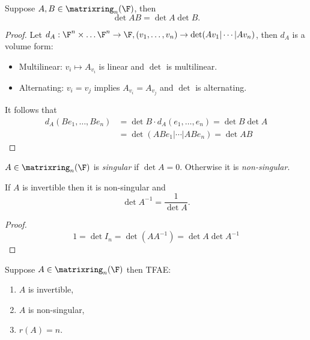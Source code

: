 \documentclass[a4paper]{article}
\newcommand*{\M}{\matrixring}
\theoremstyle{definition}
\begin{document}
\begin{proposition}
  Suppose \(A, B \in \M_n(\F)\), then
  \[
    \det AB =\det A \det B.
  \]
\end{proposition}

\begin{proof}
  Let \(d_A: \F^n \times \dots \F^n \to \F, (v_1, \dots, v_n) \to \det(Av_1|\cdots|Av_n)\), then \(d_A\) is a volume form:
  \begin{itemize}
  \item Multilinear: \(v_i \mapsto A_{v_i}\) is linear and \(\det\) is multilinear.
  \item Alternating: \(v_i = v_j\) implies \(A_{v_i} = A_{v_j}\) and \(\det\) is alternating.
  \end{itemize}
  It follows that
  \begin{align*}
    d_A(Be_1, \dots, Be_n) &= \det B \cdot d_A(e_1, \dots, e_n) = \det B \det A \\
                           &= \det (ABe_1| \cdots | ABe_n) = \det AB
  \end{align*}
\end{proof}

\begin{definition}[Singular]
  \(A \in \M_n(\F)\) is \emph{singular} if \(\det A = 0\). Otherwise it is \emph{non-singular}.
\end{definition}

\begin{lemma}
  If \(A\) is invertible then it is non-singular and
  \[
    \det A^{-1} = \frac{1}{\det A}.
  \]
\end{lemma}

\begin{proof}
  \[
    1 = \det I_n = \det(AA^{-1}) = \det A \det A^{-1}
  \]
\end{proof}

\begin{theorem}
  Suppose \(A \in \M_n(\F)\) then TFAE:
  \begin{enumerate}
  \item \(A\) is invertible,
  \item \(A\) is non-singular,
  \item \(r(A) = n\).
  \end{enumerate}
\end{theorem}
\end{document}
